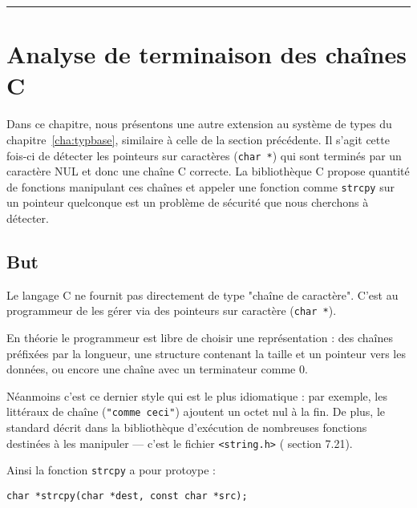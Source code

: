 


\begin{center}\rule{3in}{0.4pt}\end{center}

\clearpage

\section{Analyse de terminaison des chaînes C}%

Dans ce chapitre, nous présentons une autre extension au système de types du
chapitre~\ref{cha:typbase}, similaire à celle de la section précédente.
Il s'agit cette fois-ci de détecter les pointeurs sur caractères (\texttt{char
*}) qui sont terminés par un caractère NUL et donc une chaîne C correcte. La
bibliothèque C propose quantité de fonctions manipulant ces chaînes et appeler
une fonction comme \texttt{strcpy} sur un pointeur quelconque est un problème de
sécurité que nous cherchons à détecter.

\subsection{But}

Le langage C ne fournit pas directement de type "chaîne de caractère". C'est au
programmeur de les gérer via des pointeurs sur caractère (\texttt{char *}).

En théorie le programmeur est libre de choisir une représentation : des chaînes
préfixées par la longueur, une structure contenant la taille et un pointeur vers
les données, ou encore une chaîne avec un terminateur comme 0.

Néanmoins c'est ce dernier style qui est le plus idiomatique : par exemple, les
littéraux de chaîne (\texttt{"comme ceci"}) ajoutent un octet nul à la fin. De
plus, le standard décrit dans la bibliothèque d'exécution de nombreuses
fonctions destinées à les manipuler --- c'est le fichier
\texttt{\textless{}string.h\textgreater{}} (\cite{AnsiC} section 7.21).

Ainsi la fonction \texttt{strcpy} a pour protoype :

\begin{Verbatim}
char *strcpy(char *dest, const char *src);
\end{Verbatim}

